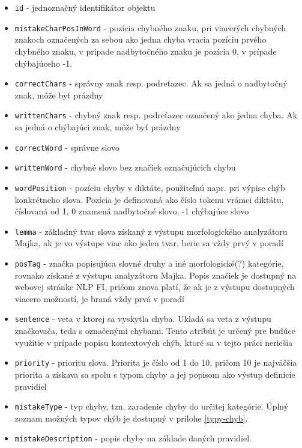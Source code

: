 \documentclass[12pt,oneside]{fithesis2}
\begin{document}
      \begin{itemize}
	\item \texttt{id} - jednoznačný identifikátor objektu
	\item \texttt{mistakeCharPosInWord} - pozícia chybného znaku, pri viacerých chybných znakoch označených za sebou ako jedna chyba vracia pozíciu prvého chybného znaku, v prípade nadbytočného znaku je pozícia 0, v prípade chýbajúceho -1.
	\item \texttt{correctChars} - správny znak resp. podreťazec. Ak sa jedná o nadbytočný znak, môže byť prázdny
	\item \texttt{writtenChars} - chybný znak resp. podreťazec označený ako jedna chyba. Ak sa jedná o chýbajúci znak, môže byť prázdny
	\item \texttt{correctWord} - správne slovo
	\item \texttt{writtenWord} - chybné slovo bez značiek označujúcich chybu
	\item \texttt{wordPosition} - pozíciu chyby v diktáte, použiteľnú napr. pri výpise chýb konkrétneho slova. Pozícia je definovaná ako číslo tokenu vrámci diktátu, číslovaná od 1, 0 znamená nadbytočné slovo, -1 chýbajúce slovo
	\item \texttt{lemma} - základný tvar slova získaný z výstupu morfologického analyzátoru Majka\cite{majka}, ak je vo výstupe viac ako jeden tvar, berie sa vždy prvý v poradí
	\item \texttt{posTag} - značka popisujúca slovné druhy a iné morfologické(?) kategórie, rovnako získané z výstupu analyzátoru Majka. Popis značiek je dostupný na webovej stránke NLP FI\cite{nlpfi}, pričom znova platí, že ak je z výstupu dostupných viacero možností, je braná vždy prvá v poradí
	\item \texttt{sentence} - veta v ktorej sa vyskytla chyba. Ukladá sa veta z výstupu značkovača, teda s označenými chybami. Tento atribút je určený pre budúce využitie v prípade popisu kontextových chýb, ktoré sa v tejto práci neriešia
	\item \texttt{priority} - prioritu slova. Priorita je číslo od 1 do 10, pričom 10 je najväčšia priorita a získava sa spolu s typom chyby a jej popisom ako výstup definície pravidiel
	\item \texttt{mistakeType} - typ chyby, tzn. zaradenie chyby do určitej kategórie. Úplný zoznam možných typov chýb je dostupný v prílohe \ref{typy-chyb}.
	\item \texttt{mistakeDescription} - popis chyby na základe daných pravidiel.
\end{itemize}
\end{document}
